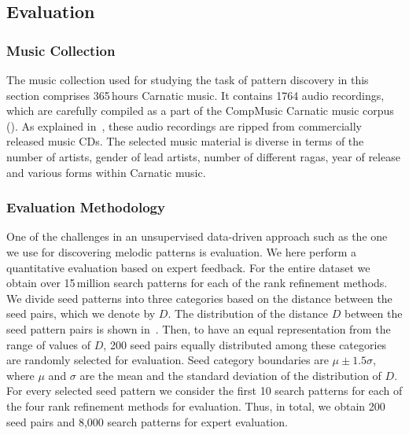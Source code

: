 \subsection{Evaluation}

\subsubsection{Music Collection}
\label{sec:pattern_discovery_musiccollection}

The music collection used for studying the task of pattern discovery in this section comprises 365\,hours Carnatic music. It contains 1764 audio recordings, which are carefully compiled as a part of the CompMusic Carnatic music corpus (). As explained in~, these audio recordings are ripped from commercially released music CDs. The selected music material is diverse in terms of the number of artists, gender of lead artists, number of different \glspl{raga}, year of release and various forms within Carnatic music.



\subsubsection{Evaluation Methodology}
\label{sec:evaluationmethodology}

One of the challenges in an unsupervised data-driven approach such as the one we use for discovering melodic patterns is evaluation. We here perform a quantitative evaluation based on expert feedback. For the entire dataset we obtain over 15\,million search patterns for each of the rank refinement methods. We divide seed patterns into three categories based on the distance between the seed pairs, which we denote by $D$. The distribution of the distance $D$ between the seed pattern pairs is shown in~. Then, to have an equal representation from the range of values of $D$, 200 seed pairs equally distributed among these categories are randomly selected for evaluation. Seed category boundaries are $\mu \pm 1.5\sigma$, where $\mu$ and $\sigma$ are the mean and the standard deviation of the distribution of $D$. For every selected seed pattern we consider the first 10 search patterns for each of the four rank refinement methods for evaluation. Thus, in total, we obtain 200 seed pairs and 8,000 search patterns for expert evaluation.

